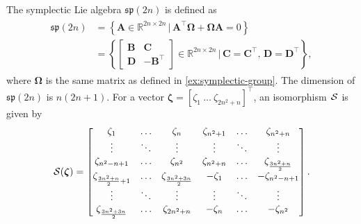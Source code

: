 \begin{example}
    The symplectic Lie algebra $\mathfrak{sp}(2n)$ is defined as
    \begin{align*}
        \begin{split}
            \mathfrak{sp}(2n) &= \left\{ \mathbf{A} \in \mathbb{R}^{2n\times 2n} \,|\, \mathbf{A}^\top\boldsymbol{\Omega} + \boldsymbol{\Omega}\mathbf{A} = 0 \right\} \\&= \left\{ \begin{bmatrix} \mathbf{B} & \mathbf{C} \\ \mathbf{D} & -\mathbf{B}^\top \end{bmatrix}\in \mathbb{R}^{2n\times 2n}\,\biggl|\,  \mathbf{C} = \mathbf{C}^\top,\, \mathbf{D} = \mathbf{D}^\top\right\},            
        \end{split}
    \end{align*}
    where $\boldsymbol{\Omega}$ is the same matrix as defined in \autoref{ex:symplectic-group}. The dimension of $\mathfrak{sp}(2n)$ is $n(2n + 1)$. For a vector $\boldsymbol{\zeta} = [\zeta_1\ \dots\ \zeta_{2n^2+n}]^\top$, an isomorphism $\SL$ is given by
    \begin{align*}
        \SL[\boldsymbol{\zeta}] = \begin{bmatrix}
            \zeta_1 & \dots & \zeta_n & \zeta_{n^2 + 1} & \dots & \zeta_{n^2 + n} \\
            \vdots & \ddots & \vdots & \vdots & \ddots & \vdots \\
            \zeta_{n^2 - n + 1} & \dots & \zeta_{n^2} & \zeta_{n^2 + n} & \dots & \zeta_{\frac{3n^2+n}{2}}\\
            \zeta_{\frac{3n^2+n}{2} + 1} & \dots & \zeta_{\frac{3n^2+3n}{2}} & -\zeta_1 & \dots & -\zeta_{n^2 - n + 1}\\
            \vdots & \ddots & \vdots & \vdots & \ddots & \vdots\\
            \zeta_{\frac{3n^2+3n}{2}} & \dots & \zeta_{2n^2 + n}& -\zeta_n & \dots & -\zeta_{n^2} 
        \end{bmatrix}.
    \end{align*}
\end{example}
